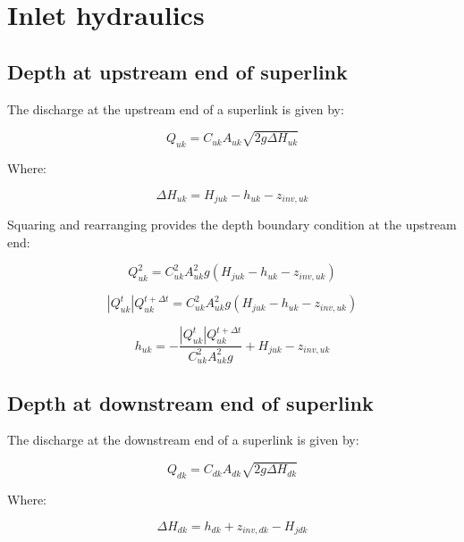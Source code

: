 \documentclass[11pt]{article}
\begin{document}
\section*{Inlet hydraulics}

\subsection*{Depth at upstream end of superlink}

The discharge at the upstream end of a superlink is given by:

\begin{equation}
 Q_{uk} = C_{uk} A_{uk} \sqrt{2 g \Delta H_{uk}} 
\end{equation}

Where:

\begin{equation}
 \Delta H_{uk} = H_{juk} - h_{uk} - z_{inv, uk}
\end{equation}

Squaring and rearranging provides the depth boundary condition at the upstream end:

\begin{equation}
 Q_{uk}^2 = C_{uk}^2 A_{uk}^2 g (H_{juk} - h_{uk} - z_{inv, uk})
\end{equation}

\begin{equation}
 |Q_{uk}^{t}| Q_{uk}^{t + \Delta t} = C_{uk}^2 A_{uk}^2 g (H_{juk} - h_{uk} - z_{inv, uk})
\end{equation}

\begin{equation}
  h_{uk} = -\frac{|Q_{uk}^{t}| Q_{uk}^{t + \Delta t}}{C_{uk}^2 A_{uk}^2 g} + H_{juk} - z_{inv, uk}
\end{equation}

\subsection*{Depth at downstream end of superlink}

The discharge at the downstream end of a superlink is given by:

\begin{equation}
 Q_{dk} = C_{dk} A_{dk} \sqrt{2 g \Delta H_{dk}} 
\end{equation}

Where:

\begin{equation}
 \Delta H_{dk} = h_{dk} + z_{inv, dk} - H_{jdk}
\end{equation}
\end{document}
